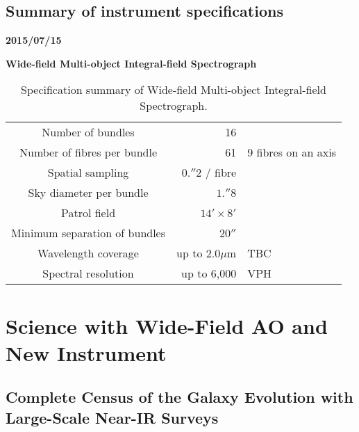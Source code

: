 \bigskip


\bigskip

\subsection{Summary of instrument specifications}

\par\noindent
{\bf 2015/07/15}

\bigskip

\par\noindent
{\bf Wide-field Multi-object Integral-field Spectrograph}

\begin{table}[!ht]
\begin{center}
\begin{tabular}{|c|r|l|}
\hline
Number of bundles &  16 & \\
Number of fibres per bundle & 61 & 9 fibres on an axis\\
Spatial sampling & $0.''2$ / fibre & \\
Sky diameter per bundle & $1.''8$ & \\
Patrol field & $14' \times 8'$ & \\
Minimum separation of bundles & $20''$ & \\
Wavelength coverage & up to 2.0$\mu$m & TBC\\
Spectral resolution & up to 6,000 & VPH \\
\hline
\end{tabular}
\end{center}
\caption{Specification summary of Wide-field Multi-object Integral-field
 Spectrograph.}
\label{tab:es_inst_MOIFU}
\end{table}


\section{Science with Wide-Field AO and New Instrument}

\subsection{Complete Census of the Galaxy Evolution with Large-Scale
  Near-IR Surveys}

